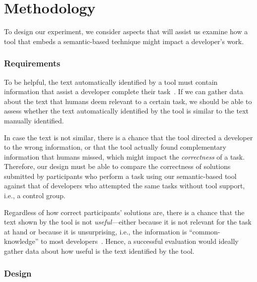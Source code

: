 
\section{Methodology}
\label{cp6:design}




To design our experiment, we consider  aspects that will assist us examine how a tool that embeds a semantic-based technique might impact a developer's work.



\subsubsection{Requirements}



To be helpful, the text automatically identified by a tool must contain information that assist a developer complete their task~\cite{Robillard2015}. If we can gather data about the text that humans deem relevant to a certain task, we should be able to assess whether the text automatically identified by the tool is similar to the text manually identified. 


In case the text is not similar,
there is a chance that the tool directed a developer to the wrong information, or that 
the tool actually found complementary information that humans missed, which might impact the \textit{correctness} of a task. Therefore, our design must be able to compare the correctness of solutions submitted by participants who perform a task using our semantic-based tool against that of developers who attempted the same tasks without tool support, i.e., a control group.


Regardless of how correct participants' solutions are, there is a chance that the text shown by the tool is not \textit{useful}---either because it is not relevant for the task at hand or because it is unsurprising, i.e., the information is ``common-knowledge'' to most developers~\cite{cwalina2008, Robillard2015}. Hence, a successful evaluation would 
ideally
gather data about how useful is the text identified by the tool. 



\subsubsection{Design}




